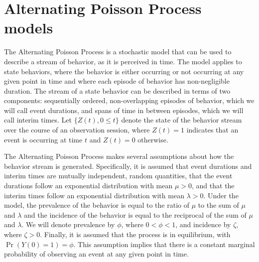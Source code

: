 \documentclass[man, noextraspace, floatsintext]{apa6}\usepackage[]{graphicx}\usepackage[]{color}
\begin{document}
\section{Alternating Poisson Process models}
\label{sec:APP}

The Alternating Poisson Process is a stochastic model that can be used to describe a stream of behavior, as it is perceived in time. 
The model applies to state behaviors, where the behavior is either occurring or not occurring at any given point in time and where each episode of behavior has non-negligible duration. 
The stream of a state behavior can be described in terms of two components: sequentially ordered, non-overlapping episodes of behavior, which we will call event durations, and spans of time in between episodes, which we will call interim times. 
Let $\{Z(t), 0 \leq t\}$ denote the state of the behavior stream over the course of an observation session, where $Z(t) = 1$ indicates that an event is occurring at time $t$ and $Z(t) = 0$ otherwise.

The Alternating Poisson Process makes several assumptions about how the behavior stream is generated. 
Specifically, it is assumed that event durations and interim times are mutually independent, random quantities, that the event durations follow an exponential distribution with mean $\mu > 0$, and that the interim times follow an exponential distribution with mean $\lambda > 0$. 
Under the model, the prevalence of the behavior is equal to the ratio of $\mu$ to the sum of $\mu$ and $\lambda$ and the incidence of the behavior is equal to the reciprocal of the sum of $\mu$ and $\lambda$. 
We will denote prevalence by $\phi$, where $0 < \phi < 1$, and incidence by $\zeta$, where $\zeta > 0$. Finally, it is assumed that the process is in equilibrium, with $\Pr\left(Y(0) = 1\right) = \phi$. 
This assumption implies that there is a constant marginal probability of observing an event at any given point in time.
\end{document}
